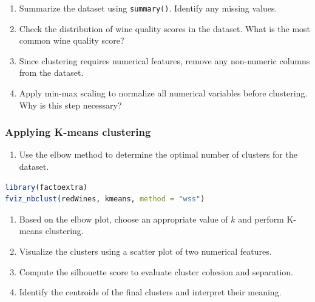 \documentclass[
  11pt,
]{book}
\newcommand{\passthrough}[1]{#1}
\providecommand{\tightlist}{%
  \setlength{\itemsep}{0pt}\setlength{\parskip}{0pt}}
\theoremstyle{definition}
\theoremstyle{definition}
\theoremstyle{definition}
\theoremstyle{definition}
\theoremstyle{remark}
\begin{document}
\begin{enumerate}
\def\labelenumi{\arabic{enumi}.}
\setcounter{enumi}{21}
\tightlist
\item
  Summarize the dataset using \passthrough{\lstinline!summary()!}. Identify any missing values.\\
\item
  Check the distribution of wine quality scores in the dataset. What is the most common wine quality score?\\
\item
  Since clustering requires numerical features, remove any non-numeric columns from the dataset.\\
\item
  Apply min-max scaling to normalize all numerical variables before clustering. Why is this step necessary?
\end{enumerate}

\subsubsection*{Applying K-means clustering}\label{applying-k-means-clustering-1}


\begin{enumerate}
\def\labelenumi{\arabic{enumi}.}
\setcounter{enumi}{25}
\tightlist
\item
  Use the elbow method to determine the optimal number of clusters for the dataset.\\
\end{enumerate}

\begin{lstlisting}[language=R]
library(factoextra)
fviz_nbclust(redWines, kmeans, method = "wss")
\end{lstlisting}

\begin{enumerate}
\def\labelenumi{\arabic{enumi}.}
\setcounter{enumi}{26}
\tightlist
\item
  Based on the elbow plot, choose an appropriate value of \(k\) and perform K-means clustering.\\
\item
  Visualize the clusters using a scatter plot of two numerical features.\\
\item
  Compute the silhouette score to evaluate cluster cohesion and separation.\\
\item
  Identify the centroids of the final clusters and interpret their meaning.
\end{enumerate}
\end{document}
